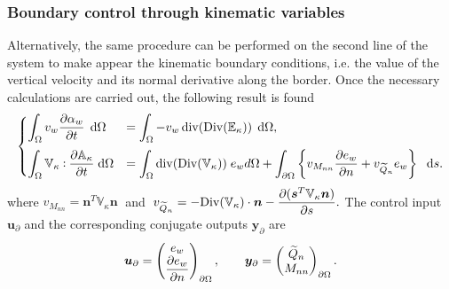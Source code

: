 \documentclass[preprint,12pt]{elsarticle}
\def\onedot{$\mathsurround0pt\ldotp$}
\def\cddot{%
	\mathbin{\vcenter{\baselineskip.67ex
			\hbox{\onedot}\hbox{\onedot}}%
}}
\begin{document}
	\subsubsection{Boundary control through kinematic variables}
	Alternatively, the same procedure can be performed on the second line of the system to make appear the kinematic boundary conditions, i.e. the value of the vertical velocity and its normal derivative along the border. Once the necessary calculations are carried out, the following result is found 
	\begin{equation}
	\begin{cases}
	\displaystyle\int_{\Omega} v_w \diffp{\alpha_w}{t} \, \d\Omega &=  \displaystyle\int_{\Omega} -v_w \, \mathrm{div}(\mathrm{Div}(\mathbb{E}_{\kappa})) \,  \d\Omega, \vspace{2mm}\\
	\displaystyle\int_{\Omega} \mathbb{V}_{\kappa} \cddot \diffp{\mathbb{A}_{\kappa}}{t}   \d\Omega &= \displaystyle\int_{\Omega} \mathrm{div}(\mathrm{Div}(\mathbb{V}_{\kappa})) \; e_w  d\Omega +  \displaystyle\int_{\partial \Omega} \left\{ {v}_{M_{nn}} \diffp{e_w}{n}  + v_{\widetilde{Q}_n} e_w \right\} \  \d{s}. 
	\end{cases}
	\end{equation}
	where ${v}_{M_{nn}} = \bm{n}^T \mathbb{V}_{\kappa} \bm{n} \; $ and $ \; v_{\widetilde{Q}_n} = - \displaystyle \mathrm{Div}(\mathbb{V}_{\kappa}) \cdot \bm{n} - \diffp{ (\bm{s}^T \mathbb{V}_{\kappa} \bm{n}) }{s}.$ The control input $\bm{u}_\partial$ and the corresponding conjugate outputs $\bm{y}_\partial$ are 
	\[\bm{u}_\partial = 
	\begin{pmatrix}
	e_w \\
	\displaystyle \diffp{e_w}{n} \\
	\end{pmatrix}_{\partial \Omega}, \qquad
	\bm{y}_\partial = 
	\begin{pmatrix}
	\widetilde{Q}_n \\
	M_{nn} \\
	\end{pmatrix}_{\partial \Omega}.
	\]
	
\end{document}
